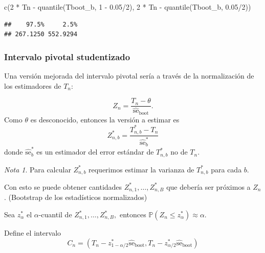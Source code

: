 \documentclass[
  12pt,
]{book}
\newenvironment{Shaded}{\begin{snugshade}}{\end{snugshade}}
\newcommand{\DecValTok}[1]{\textcolor[rgb]{0.00,0.00,0.81}{#1}}
\newcommand{\FloatTok}[1]{\textcolor[rgb]{0.00,0.00,0.81}{#1}}
\newcommand{\FunctionTok}[1]{\textcolor[rgb]{0.00,0.00,0.00}{#1}}
\newcommand{\NormalTok}[1]{#1}
\newcommand{\SpecialCharTok}[1]{\textcolor[rgb]{0.00,0.00,0.00}{#1}}
\theoremstyle{definition}
\theoremstyle{definition}
\theoremstyle{definition}
\theoremstyle{definition}
\theoremstyle{remark}
\newtheorem*{remark}{Nota}
\begin{document}
\begin{Shaded}
\begin{Highlighting}[]
\FunctionTok{c}\NormalTok{(}\DecValTok{2} \SpecialCharTok{*}\NormalTok{ Tn }\SpecialCharTok{{-}} \FunctionTok{quantile}\NormalTok{(Tboot\_b, }\DecValTok{1} \SpecialCharTok{{-}} \FloatTok{0.05}\SpecialCharTok{/}\DecValTok{2}\NormalTok{), }\DecValTok{2} \SpecialCharTok{*}\NormalTok{ Tn }\SpecialCharTok{{-}}
    \FunctionTok{quantile}\NormalTok{(Tboot\_b, }\FloatTok{0.05}\SpecialCharTok{/}\DecValTok{2}\NormalTok{))}
\end{Highlighting}
\end{Shaded}

\begin{verbatim}
##    97.5%     2.5% 
## 267.1250 552.9294
\end{verbatim}

\hypertarget{intervalo-pivotal-studentizado}{%
\subsubsection{Intervalo pivotal studentizado}\label{intervalo-pivotal-studentizado}}

Una versión mejorada del intervalo pivotal sería a través de la normalización de los estimadores de \(T_n\):

\[
Z_{n}=\frac{T_{n}-\theta}{\widehat{\mathrm{se}}_{\mathrm{boot}}}.
\]
Como \(\theta\) es desconocido, entonces la versión a estimar es
\[
Z_{n, b}^{*}=\frac{T_{n, b}^{*}-T_{n}}{\widehat{\mathrm{se}}_{b}^{*}}
\]
donde \(\widehat{\mathrm{se}}_{b}^{*}\) es un estimador del error estándar de \(T_{n, b}^{*}\) no de \(T_{n}\).

\begin{remark}
Para calcular \(Z_{n, b}^{*}\) requerimos estimar la varianza de \(T_{n,b}^*\) para cada \(b\).
\end{remark}

Con esto se puede obtener cantidades \(Z_{n, 1}^{*}, \ldots, Z_{n, B}^{*}\) que debería ser próximos a \(Z_{n}\). (Bootstrap de los estadísticos normalizados)

Sea \(z_{\alpha}^{*}\) el \(\alpha\)-cuantil de \(Z_{n, 1}^{*}, \ldots, Z_{n, B}^{*},\) entonces \(\mathbb{P}\left(Z_{n} \leq z_{\alpha}^{*}\right) \approx \alpha\).

Define el intervalo
\begin{equation*}
C_{n}=\left(T_{n}-z_{1-\alpha / 2}^{*} \widehat{\mathrm{se}}_{\mathrm{boot}}, T_{n}-z_{\alpha / 2}^{*} \widehat{\mathrm{se}}_{\mathrm{boot}}\right)
\end{equation*}
\end{document}

